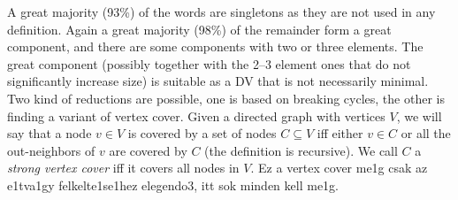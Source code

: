 \documentclass[a4paper,10pt]{article}
\begin{document}
A great majority (93\%) of the words are singletons as they are not used in
any definition. Again a great majority (98\%) of the remainder form a great
component, and there are some components with two or three elements. The great
component (possibly together with the 2--3 element ones that do not
significantly increase size) is suitable as a DV that is not necessarily
minimal. Two kind of reductions are possible, one is based on breaking cycles,
the other is finding a variant of vertex cover. Given a directed graph with
vertices $V$, we will say that a node $v\in V$ is covered by a set of nodes
$C\subseteq V$ iff either $v\in C$ or all the out-neighbors of $v$ are covered
by $C$ (the definition is recursive). We call $C$ a \emph{strong vertex cover}
iff it covers all nodes in $V$. {\color{red} Ez a vertex cover me1g csak az
  e1tva1gy felkelte1se1hez elegendo3, itt sok minden kell me1g.}



\end{document}
